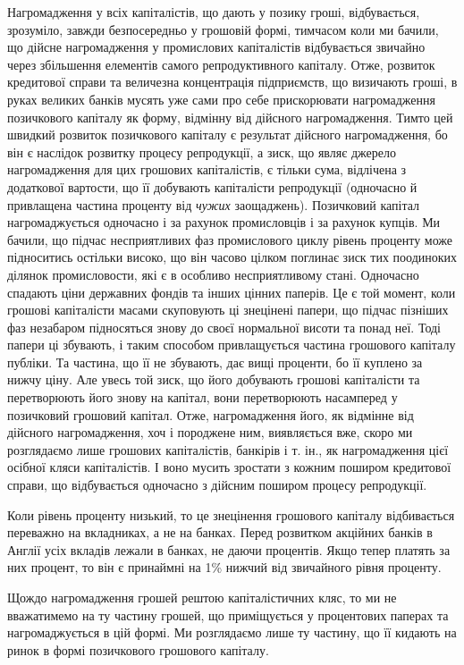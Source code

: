 
Нагромадження у всіх капіталістів, що дають у позику гроші, відбувається,
зрозуміло, завжди безпосередньо у грошовій формі, тимчасом коли ми бачили, що
дійсне нагромадження у промислових капіталістів відбувається звичайно через
збільшення елементів самого репродуктивного капіталу. Отже, розвиток кредитової
справи та величезна концентрація підприємств, що визичають гроші, в руках
великих банків мусять уже сами про себе прискорювати нагромадження позичкового
капіталу як форму, відмінну від дійсного нагромадження. Тимто цей
швидкий розвиток позичкового капіталу є результат дійсного нагромадження,
бо він є наслідок розвитку процесу репродукції, а зиск, що являє джерело нагромадження
для цих грошових капіталістів, є тільки сума, відлічена з додаткової
вартости, що її добувають капіталісти репродукції (одночасно й привлащена
частина проценту від \emph{чужих} заощаджень). Позичковий капітал нагромаджується
одночасно і за рахунок промисловців і за рахунок купців. Ми бачили, що
підчас несприятливих фаз промислового циклу рівень проценту може підноситись
остільки високо, що він часово цілком поглинає зиск тих поодиноких ділянок
промисловости, які є в особливо несприятливому стані. Одночасно спадають ціни
державних фондів та інших цінних паперів. Це є той момент, коли грошові
капіталісти масами скуповують ці знецінені папери, що підчас пізніших фаз
незабаром підносяться знову до своєї нормальної висоти та понад неї. Тоді
папери ці збувають, і таким способом привлащується частина грошового капіталу
публіки. Та частина, що її не збувають, дає вищі проценти, бо її куплено
за нижчу ціну. Але увесь той зиск, що його добувають грошові капіталісти та
перетворюють його знову на капітал, вони перетворюють насамперед у позичковий
грошовий капітал. Отже, нагромадження його, як відмінне від дійсного нагромадження,
хоч і породжене ним, виявляється вже, скоро ми розглядаємо лише грошових
капіталістів, банкірів і т. ін., як нагромадження цієї осібної кляси капіталістів.
І воно мусить зростати з кожним поширом кредитової справи, що відбувається
одночасно з дійсним поширом процесу репродукції.

Коли рівень проценту низький, то це знецінення грошового капіталу відбивається
переважно на вкладниках, а не на банках. Перед розвитком акційних
банків в Англії  усіх вкладів лежали в банках, не даючи процентів. Якщо тепер
платять за них процент, то він є принаймні на 1\% нижчий від звичайного
рівня проценту.

Щождо нагромадження грошей рештою капіталістичних кляс, то ми не
вважатимемо на ту частину грошей, що приміщується у процентових паперах
та нагромаджується в цій формі. Ми розглядаємо лише ту частину, що її кидають
на ринок в формі позичкового грошового капіталу.

